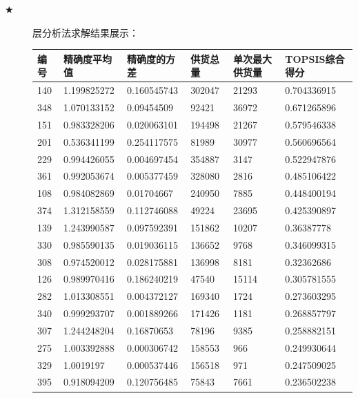 \documentclass{cumcmthesis}
\begin{document}
\begin{description}
\item[$\bigstar$] 层分析法求解结果展示：
\begin{longtable}{l|llll|l}
    \toprule
    编号  & 精确度平均值 & 精确度的方差  & 供货总量   & 单次最大供货量 & TOPSIS综合得分  \\
    \midrule
140 & 1.199825272 & 0.160545743 & 302047 & 21293 & 0.704336915 \\
348                         & 1.070133152 & 0.09454509  & 92421  & 36972 & 0.671265896 \\
151                         & 0.983328206 & 0.020063101 & 194498 & 21267 & 0.579546338 \\
201                         & 0.536341199 & 0.254117575 & 81989  & 30977 & 0.560696564 \\
229                         & 0.994426055 & 0.004697454 & 354887 & 3147  & 0.522947876 \\
361                         & 0.992053674 & 0.005377459 & 328080 & 2816  & 0.485106422 \\
108                         & 0.984082869 & 0.01704667  & 240950 & 7885  & 0.448400194 \\
374                         & 1.312158559 & 0.112746088 & 49224  & 23695 & 0.425390897 \\
139                         & 1.243990587 & 0.097592391 & 151862 & 10207 & 0.36387778  \\
330                         & 0.985590135 & 0.019036115 & 136652 & 9768  & 0.346099315 \\
308                         & 0.974520012 & 0.028175881 & 136998 & 8181  & 0.32362686  \\
126                         & 0.989970416 & 0.186240219 & 47540  & 15114 & 0.305781555 \\
282                         & 1.013308551 & 0.004372127 & 169340 & 1724  & 0.273603295 \\
340                         & 0.999293707 & 0.001889266 & 171426 & 1181  & 0.268857797 \\
307                         & 1.244248204 & 0.16870653  & 78196  & 9385  & 0.258882151 \\
275                         & 1.003392888 & 0.000306742 & 158553 & 966   & 0.249930644 \\
329                         & 1.0019197   & 0.000537446 & 156518 & 971   & 0.247509025 \\
395                         & 0.918094209 & 0.120756485 & 75843  & 7661  & 0.236502238 \\

\end{longtable}
\end{description}
\end{document}
